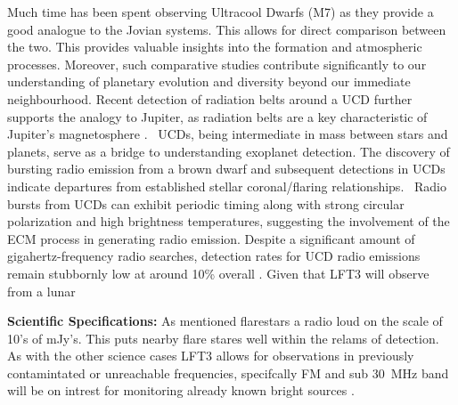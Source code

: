 Much time has been spent observing Ultracool Dwarfs (M7) as they provide a good analogue to the Jovian systems. This allows for direct comparison between the two.  This provides valuable insights into the formation and atmospheric processes. Moreover, such comparative studies contribute significantly to our understanding of planetary evolution and diversity beyond our immediate neighbourhood. Recent detection of radiation belts around a UCD further supports the analogy to Jupiter, as radiation belts are a key characteristic of Jupiter's magnetosphere \citep{joe_nature_review}. \ UCDs, being intermediate in mass between stars and planets, serve as a bridge to understanding exoplanet detection. The discovery of bursting radio emission from a brown dwarf and subsequent detections in UCDs indicate departures from established stellar coronal/flaring relationships. \ Radio bursts from UCDs can exhibit periodic timing \citep{hallinan_rotational_2006} along with strong circular polarization and high brightness temperatures, suggesting the involvement of the ECM process in generating radio emission. Despite a significant amount of gigahertz-frequency radio searches, detection rates for UCD radio emissions remain stubbornly low at around 10\% overall \citep{lynch_radio_2016}. Given that LFT3 will observe from a lunar 



\textbf{Scientific Specifications:} As mentioned flarestars a radio loud on the scale of 10's of mJy's. This puts nearby flare stares well within the relams of detection. As with the other science cases LFT3 allows for observations in previously contamintated or unreachable frequencies, specifcally FM and sub 30~MHz band will be on intrest for monitoring already known bright sources \citep{joe_nature_review}. 


